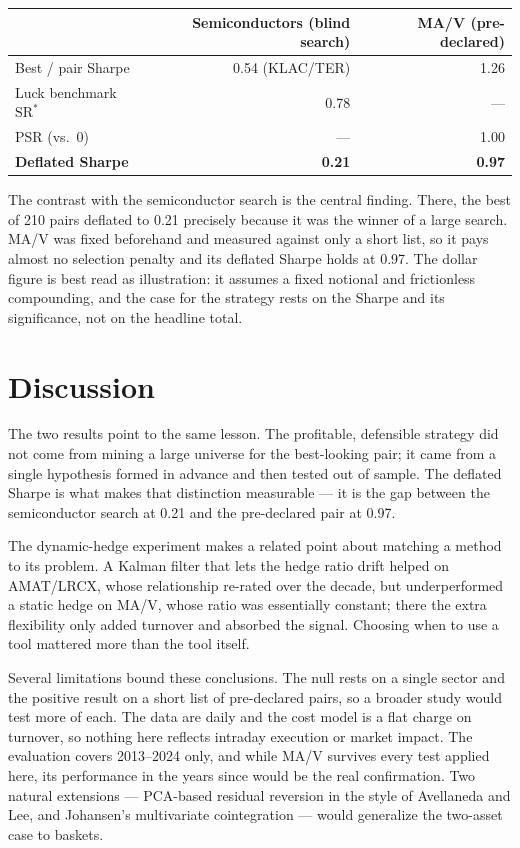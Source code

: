 \documentclass[11pt]{article}
\newcommand{\SR}{\mathrm{SR}}
\begin{document}
\begin{table}[h]\centering\small
\begin{tabular}{@{}lrr@{}}
\toprule
& \textbf{Semiconductors (blind search)} & \textbf{MA/V (pre-declared)} \\
\midrule
Best / pair Sharpe        & 0.54 (KLAC/TER) & 1.26 \\
Luck benchmark $\SR^{*}$  & 0.78            & --- \\
PSR (vs.\ 0)              & ---             & 1.00 \\
\textbf{Deflated Sharpe}  & \textbf{0.21}   & \textbf{0.97} \\
\bottomrule
\end{tabular}
\end{table}

The contrast with the semiconductor search is the central finding. There, the best of 210 pairs deflated to
0.21 precisely because it was the winner of a large search. MA/V was fixed beforehand and measured against
only a short list, so it pays almost no selection penalty and its deflated Sharpe holds at 0.97. The dollar
figure is best read as illustration: it assumes a fixed notional and frictionless compounding, and the case
for the strategy rests on the Sharpe and its significance, not on the headline total.

\section{Discussion}
The two results point to the same lesson. The profitable, defensible strategy did not come from mining a
large universe for the best-looking pair; it came from a single hypothesis formed in advance and then
tested out of sample. The deflated Sharpe is what makes that distinction measurable --- it is the gap
between the semiconductor search at 0.21 and the pre-declared pair at 0.97.

The dynamic-hedge experiment makes a related point about matching a method to its problem. A Kalman filter
that lets the hedge ratio drift helped on AMAT/LRCX, whose relationship re-rated over the decade, but
underperformed a static hedge on MA/V, whose ratio was essentially constant; there the extra flexibility
only added turnover and absorbed the signal. Choosing when to use a tool mattered more than the tool
itself.

Several limitations bound these conclusions. The null rests on a single sector and the positive result on
a short list of pre-declared pairs, so a broader study would test more of each. The data are daily and the
cost model is a flat charge on turnover, so nothing here reflects intraday execution or market impact. The
evaluation covers 2013--2024 only, and while MA/V survives every test applied here, its performance in the
years since would be the real confirmation. Two natural extensions --- PCA-based residual reversion in the
style of Avellaneda and Lee, and Johansen's multivariate cointegration --- would generalize the two-asset
case to baskets.
\end{document}
